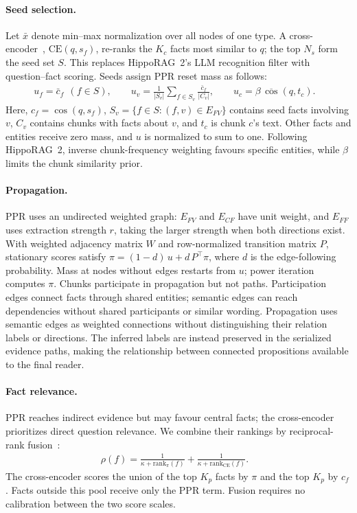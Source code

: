 \documentclass[sigconf, review, anonymous]{acmart}
\newcommand{\simcos}{\operatorname{cos}}
\begin{document}
\paragraph{Seed selection.}
Let $\bar{x}$ denote min--max normalization over all nodes of one type. A cross-encoder~\cite{nogueira2019passage}, $\mathrm{CE}(q,s_f)$, re-ranks the $K_c$ facts most similar to $q$; the top $N_s$ form the seed set $S$. This replaces HippoRAG~2's LLM recognition filter with question--fact scoring. Seeds assign PPR reset mass as follows:
\begin{align*}
&u_f=\bar{c}_f\ \ (f\in S),\qquad
u_v=\frac{1}{|S_v|}\sum_{f\in S_v}\frac{\bar{c}_f}{|C_v|},\qquad
u_c=\beta\,\overline{\simcos}(q,t_c). &&
\end{align*}
Here, $c_f=\simcos(q,s_f)$, $S_v=\{f\in S:(f,v)\in E_{FV}\}$ contains seed facts involving $v$, $C_v$ contains chunks with facts about $v$, and $t_c$ is chunk $c$'s text. Other facts and entities receive zero mass, and $u$ is normalized to sum to one. Following HippoRAG~2, inverse chunk-frequency weighting favours specific entities, while $\beta$ limits the chunk similarity prior.

\paragraph{Propagation.}
PPR uses an undirected weighted graph: $E_{FV}$ and $E_{CF}$ have unit weight, and $E_{FF}$ uses extraction strength $r$, taking the larger strength when both directions exist. With weighted adjacency matrix $W$ and row-normalized transition matrix $P$, stationary scores satisfy $\pi=(1-d)\,u+d\,P^{\top}\pi$, where $d$ is the edge-following probability. Mass at nodes without edges restarts from $u$; power iteration computes $\pi$. Chunks participate in propagation but not paths. Participation edges connect facts through shared entities; semantic edges can reach dependencies without shared participants or similar wording. Propagation uses semantic edges as weighted connections without distinguishing their relation labels or directions. The inferred labels are instead preserved in the serialized evidence paths, making the relationship between connected propositions available to the final reader.

\paragraph{Fact relevance.}
PPR reaches indirect evidence but may favour central facts; the cross-encoder prioritizes direct question relevance. We combine their rankings by reciprocal-rank fusion~\cite{cormack2009reciprocal}:
\begin{align*}
&\rho(f)=\frac{1}{\kappa+\mathrm{rank}_{\pi}(f)}+\frac{1}{\kappa+\mathrm{rank}_{\mathrm{CE}}(f)}. &&
\end{align*}
The cross-encoder scores the union of the top $K_p$ facts by $\pi$ and the top $K_p$ by $c_f$. Facts outside this pool receive only the PPR term. Fusion requires no calibration between the two score scales.
\end{document}
